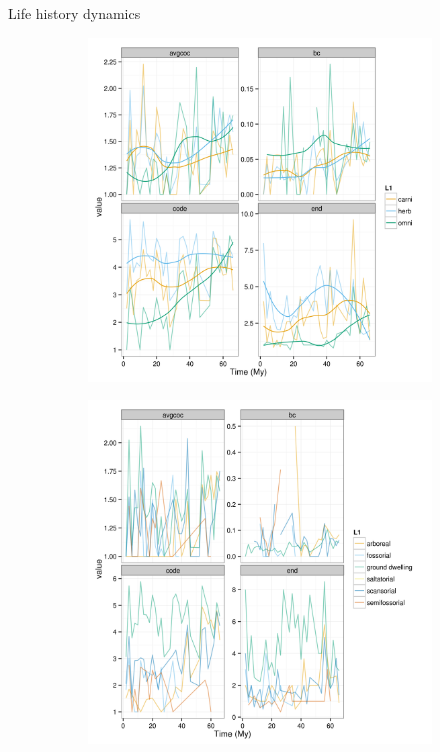 \documentclass[final]{beamer}\usepackage[]{graphicx}\usepackage[]{color}
\newlength{\onecolwid}
\newlength{\twocolwid}
\begin{document}
\begin{frame}[t]
\begin{columns}[t]
\begin{column}{\twocolwid}
      \begin{alertblock}{Life history dynamics}
        \begin{figure}[ht]
          \begin{center}
            \begin{subfigure}[b]{\onecolwid}
              \centering
              \includegraphics[width = 0.8\onecolwid]{figure/diet_bin}
              \label{fig:net_diet}
            \end{subfigure}
            \begin{subfigure}[b]{\onecolwid}
              \centering
              \includegraphics[width = 0.8\onecolwid]{figure/loco_bin}

\end{subfigure}
\end{center}
\end{figure}
\end{alertblock}
\end{column}
\end{columns}
\end{frame}
\end{document}
